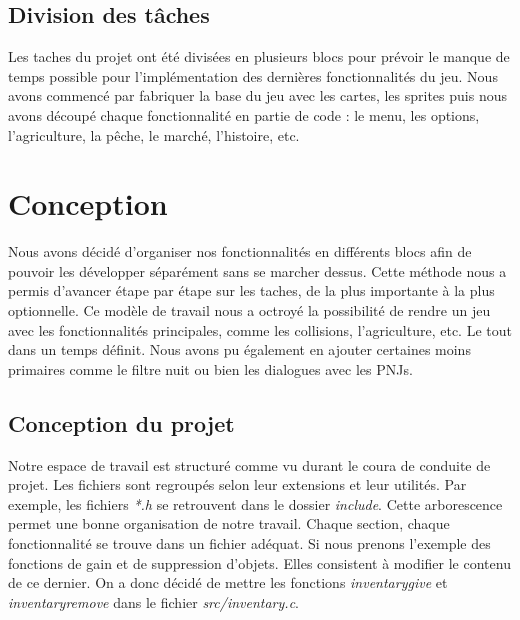 \documentclass{article}
\begin{document}
\subsection{Division des tâches}

Les taches du projet ont été divisées en plusieurs blocs pour prévoir le manque de temps possible pour l'implémentation des dernières fonctionnalités du jeu. Nous avons commencé par fabriquer la base du jeu avec les cartes, les sprites puis nous avons découpé chaque fonctionnalité en partie de code : le menu, les options, l'agriculture, la pêche, le marché, l'histoire, etc.




\section{Conception}
Nous avons décidé d'organiser nos fonctionnalités en différents blocs afin de pouvoir les développer séparément sans se marcher dessus. Cette méthode nous a permis d'avancer étape par étape sur les taches, de la plus importante à la plus optionnelle. Ce modèle de travail nous a octroyé la possibilité de rendre un jeu avec les fonctionnalités principales, comme les collisions, l'agriculture, etc. Le tout dans un temps définit. Nous avons pu également en ajouter certaines moins primaires comme le filtre nuit ou bien les dialogues avec les PNJs. 
    
\subsection{Conception du projet}

 Notre espace de travail est structuré comme vu durant le coura de conduite de projet. Les fichiers sont regroupés selon leur extensions et leur utilités. Par exemple, les fichiers \textit{*.h} se retrouvent dans le dossier \textit{include}. Cette arborescence permet une bonne organisation de notre travail. Chaque section, chaque fonctionnalité se trouve dans un fichier adéquat. Si nous prenons l'exemple des fonctions de gain et de suppression d'objets. Elles consistent à modifier le contenu de ce dernier. On a donc décidé de mettre les fonctions \textit{inventary\textunderscore give} et \textit{inventary\textunderscore remove} dans le fichier \textit{src/inventary.c}.
\end{document}
